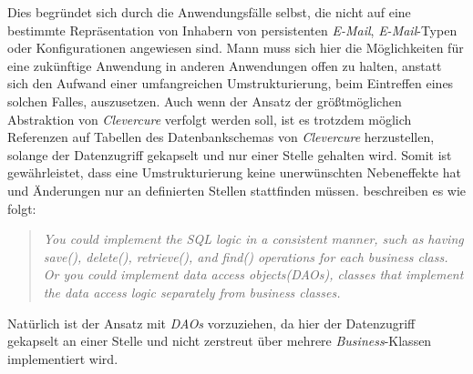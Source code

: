 \newline
\newline
Dies begründet sich durch die Anwendungsfälle selbst, die nicht auf eine bestimmte Repräsentation von Inhabern von persistenten \emph{E-Mail}, \emph{E-Mail}-Typen oder Konfigurationen angewiesen sind. Mann muss sich hier die Möglichkeiten für eine zukünftige Anwendung in anderen Anwendungen offen zu halten, anstatt sich den Aufwand einer umfangreichen Umstrukturierung, beim Eintreffen eines solchen Falles, auszusetzen. 
\newline
\newline
Auch wenn der Ansatz der größtmöglichen Abstraktion von \emph{Clevercure} verfolgt werden soll, ist es trotzdem möglich Referenzen auf Tabellen des Datenbankschemas von \emph{Clevercure} herzustellen, solange der Datenzugriff gekapselt und nur einer Stelle gehalten wird. Somit ist gewährleistet, dass eine Umstrukturierung keine unerwünschten Nebeneffekte hat und Änderungen nur an definierten Stellen stattfinden müssen. \cite[66]{refactoreDatabase} beschreiben es wie folgt:
\begin{quote}
\emph{You could implement the SQL logic in a consistent manner, such as having save(), delete(), retrieve(), and find() operations for each business class. Or you could implement data access objects(DAOs), classes that implement the data access logic separately from business classes.}
\end{quote}
Natürlich ist der Ansatz mit \emph{DAOs} vorzuziehen, da hier der Datenzugriff gekapselt an einer Stelle und nicht zerstreut über mehrere \emph{Business}-Klassen implementiert wird.
\newpage
